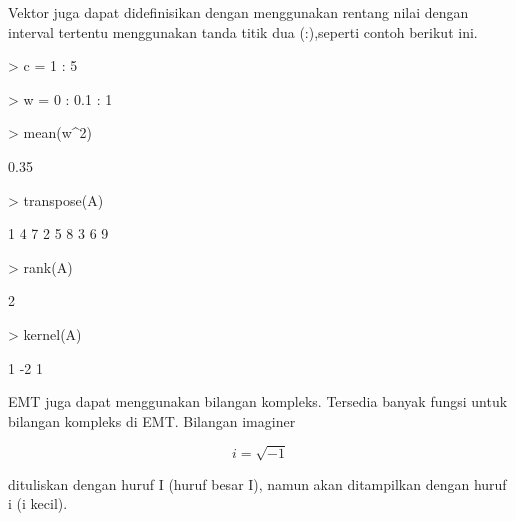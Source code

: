 \documentclass[a4paper,10pt]{article}
\begin{document}
\begin{eulernotebook}
\begin{eulercomment}
\begin{eulercomment}
\begin{eulercomment}
Vektor juga dapat didefinisikan dengan menggunakan rentang nilai
dengan interval tertentu menggunakan tanda titik dua (:),seperti
contoh berikut ini.
\end{eulercomment}
\begin{eulerprompt}
> c = 1 : 5
\end{eulerprompt}
\begin{euleroutput}
  [1,  2,  3,  4,  5]
\end{euleroutput}
\begin{eulerprompt}
> w = 0 : 0.1 : 1
\end{eulerprompt}
\begin{euleroutput}
  [0,  0.1,  0.2,  0.3,  0.4,  0.5,  0.6,  0.7,  0.8,  0.9,  1]
\end{euleroutput}
\begin{eulerprompt}
> mean(w^2)
\end{eulerprompt}
\begin{euleroutput}
  0.35
\end{euleroutput}
\begin{eulerprompt}
> transpose(A)
\end{eulerprompt}
\begin{euleroutput}
              1             4             7 
              2             5             8 
              3             6             9 
\end{euleroutput}
\begin{eulerprompt}
> rank(A)
\end{eulerprompt}
\begin{euleroutput}
  2
\end{euleroutput}
\begin{eulerprompt}
> kernel(A)
\end{eulerprompt}
\begin{euleroutput}
              1 
             -2 
              1 
\end{euleroutput}
\begin{eulercomment}
EMT juga dapat menggunakan bilangan kompleks. Tersedia banyak fungsi
untuk bilangan kompleks di EMT. Bilangan imaginer

\end{eulercomment}
\begin{eulerformula}
\[
i = \sqrt{-1}
\]
\end{eulerformula}
\begin{eulercomment}
dituliskan dengan huruf I (huruf besar I), namun akan ditampilkan
dengan huruf i (i kecil).


\end{eulercomment}
\end{eulercomment}
\end{eulercomment}
\end{eulernotebook}
\end{document}
